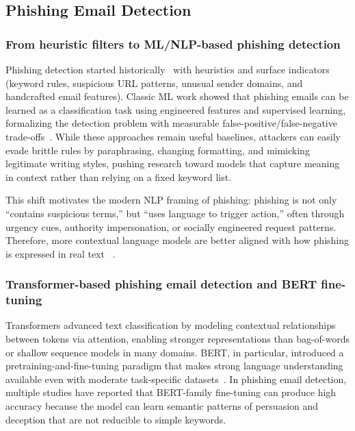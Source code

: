 \documentclass[conference]{IEEEtran}
\begin{document}
\subsection{Phishing Email Detection}

\subsubsection{From heuristic filters to ML/NLP-based phishing detection}

Phishing detection started historically~\cite{INA2007} with heuristics and surface indicators (keyword rules, suspicious URL patterns, unusual sender domains, and handcrafted email features). Classic ML work showed that phishing emails can be learned as a classification task using engineered features and supervised learning, formalizing the detection problem with measurable false-positive/false-negative trade-offs~\cite{INA2007}. While these approaches remain useful baselines, attackers can easily evade brittle rules by paraphrasing, changing formatting, and mimicking legitimate writing styles, pushing research toward models that capture meaning in context rather than relying on a fixed keyword list.

This shift motivates the modern NLP framing of phishing: phishing is not only “contains suspicious terms,” but “uses language to trigger action,” often through urgency cues, authority impersonation, or socially engineered request patterns. Therefore, more contextual language models are better aligned with how phishing is expressed in real text~\cite{JMKK2019} \cite{INA2007}.

\subsubsection{Transformer-based phishing email detection and BERT fine-tuning}

Transformers advanced text classification by modeling contextual relationships between tokens via attention, enabling stronger representations than bag-of-words or shallow sequence models in many domains. BERT, in particular, introduced a pretraining-and-fine-tuning paradigm that makes strong language understanding available even with moderate task-specific datasets~\cite{JMKK2019}. In phishing email detection, multiple studies have reported that BERT-family fine-tuning can produce high accuracy because the model can learn semantic patterns of persuasion and deception that are not reducible to simple keywords.
\end{document}
